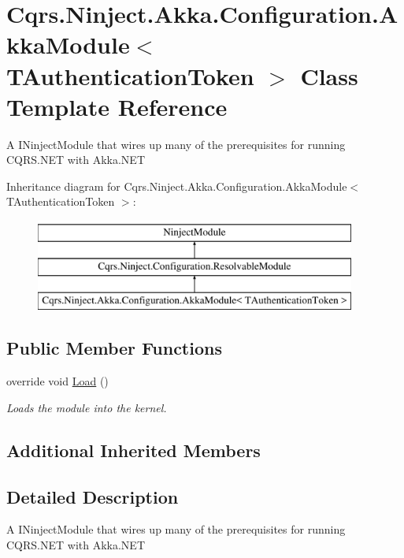 \hypertarget{classCqrs_1_1Ninject_1_1Akka_1_1Configuration_1_1AkkaModule}{}\section{Cqrs.\+Ninject.\+Akka.\+Configuration.\+Akka\+Module$<$ T\+Authentication\+Token $>$ Class Template Reference}
\label{classCqrs_1_1Ninject_1_1Akka_1_1Configuration_1_1AkkaModule}


A I\+Ninject\+Module that wires up many of the prerequisites for running C\+Q\+R\+S.\+N\+ET with Akka.\+N\+ET  


Inheritance diagram for Cqrs.\+Ninject.\+Akka.\+Configuration.\+Akka\+Module$<$ T\+Authentication\+Token $>$\+:\begin{figure}[H]
\begin{center}
\leavevmode
\includegraphics[height=3.000000cm]{classCqrs_1_1Ninject_1_1Akka_1_1Configuration_1_1AkkaModule}
\end{center}
\end{figure}
\subsection*{Public Member Functions}
\begin{DoxyCompactItemize}
\item 
override void \hyperlink{classCqrs_1_1Ninject_1_1Akka_1_1Configuration_1_1AkkaModule_ac20ff271987cecce0c8e0d8507adefc0_ac20ff271987cecce0c8e0d8507adefc0}{Load} ()
\begin{DoxyCompactList}\small\item\em Loads the module into the kernel. \end{DoxyCompactList}\end{DoxyCompactItemize}
\subsection*{Additional Inherited Members}


\subsection{Detailed Description}
A I\+Ninject\+Module that wires up many of the prerequisites for running C\+Q\+R\+S.\+N\+ET with Akka.\+N\+ET 


